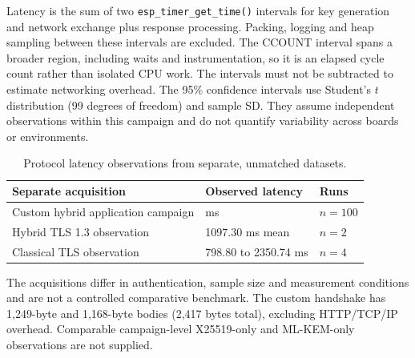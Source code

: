 \documentclass[journal, 10pt]{IEEEtran}
\begin{document}
Latency is the sum of two \texttt{esp\_timer\_get\_time()} intervals for key generation and network exchange plus response processing. Packing, logging and heap sampling between these intervals are excluded. The CCOUNT interval spans a broader region, including waits and instrumentation, so it is an elapsed cycle count rather than isolated CPU work. The intervals must not be subtracted to estimate networking overhead. The 95\% confidence intervals use Student's $t$ distribution (99 degrees of freedom) and sample SD. They assume independent observations within this campaign and do not quantify variability across boards or environments.

\begin{table}[htbp]
\caption{Protocol latency observations from separate, unmatched datasets.}
\centering
\small
\begin{tabularx}{\columnwidth}{lXX}
\toprule
Separate acquisition & Observed latency & Runs\\
\midrule
Custom hybrid application campaign & \BenchmarkMeanMs{} ms & $n=100$\\
Hybrid TLS 1.3 observation & 1097.30 ms mean & $n=2$\\
Classical TLS observation & 798.80 to 2350.74 ms & $n=4$\\
\bottomrule
\end{tabularx}
\par\smallskip\footnotesize
The acquisitions differ in authentication, sample size and measurement conditions and are not a controlled comparative benchmark. The custom handshake has 1,249-byte and 1,168-byte bodies (2,417 bytes total), excluding HTTP/TCP/IP overhead. Comparable campaign-level X25519-only and ML-KEM-only observations are not supplied.
\label{tab:protocol_comparison}
\end{table}
\end{document}
